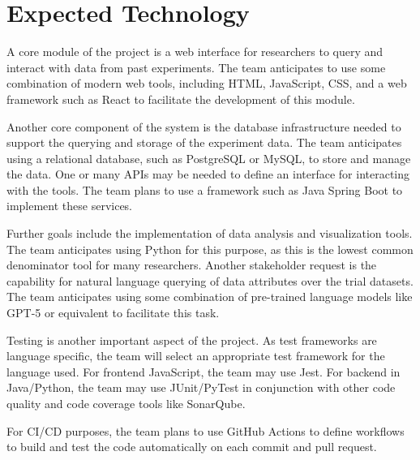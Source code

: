 \documentclass{article}
\begin{document}
\section{Expected Technology}


A core module of the project is a web interface for researchers to query and interact with data from past experiments. 
The team anticipates to use some combination of modern web tools, including HTML, JavaScript, CSS, and a web framework such as React to facilitate the development of this module. 

Another core component of the system is the database infrastructure needed to support the querying and storage of the experiment data. The team anticipates using a relational database, such as PostgreSQL or MySQL, to store and manage the data. One or many APIs may be needed to define an interface for interacting with the tools. The team plans to use a framework such as Java Spring Boot to implement these services. 

Further goals include the implementation of data analysis and visualization tools. The team anticipates using Python for this purpose, as this is the lowest common denominator tool for many researchers. Another stakeholder request is the capability for natural language querying of data attributes over the trial datasets. The team anticipates using some combination of pre-trained language models like GPT-5 or equivalent to facilitate this task. 

Testing is another important aspect of the project. As test frameworks are language specific, the team will select an appropriate test framework for the language used. For frontend JavaScript, the team may use Jest. For backend in Java/Python, the team may use JUnit/PyTest in conjunction with other code quality and code coverage tools like SonarQube.

For CI/CD purposes, the team plans to use GitHub Actions to define workflows to build and test the code automatically on each commit and pull request.



\end{document}
